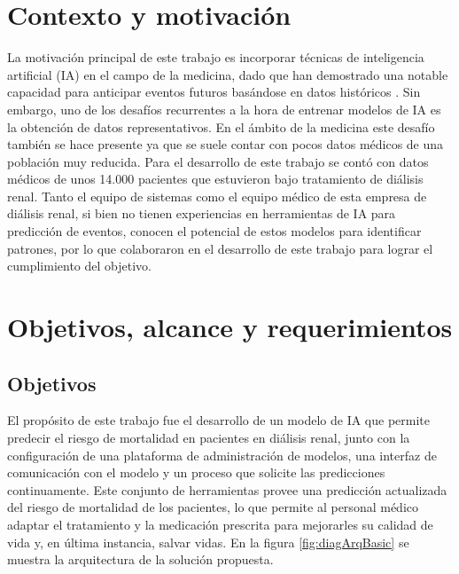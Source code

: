 \section{Contexto y motivación}

La motivación principal de este trabajo es incorporar técnicas de inteligencia artificial (IA) en el campo de la medicina, dado que han demostrado una notable capacidad para anticipar eventos futuros basándose en datos históricos \citep{ARTICULO2}. 
Sin embargo, uno de los desafíos recurrentes a la hora de entrenar modelos de IA es la obtención de datos representativos. En el ámbito de la medicina este desafío también se hace presente ya que se suele contar con pocos datos médicos de una población muy reducida.
Para el desarrollo de este trabajo se contó con datos médicos de unos 14.000 pacientes que estuvieron bajo tratamiento de diálisis renal. 
Tanto el equipo de sistemas como el equipo médico de esta empresa de diálisis renal, si bien no tienen experiencias en herramientas de IA para predicción de eventos, conocen el potencial de estos modelos para identificar patrones, por lo que colaboraron en el desarrollo de este trabajo para lograr el cumplimiento del objetivo.


\section{Objetivos, alcance y requerimientos}

\subsection{Objetivos}

El propósito de este trabajo fue el desarrollo de un modelo de IA que permite predecir el riesgo de mortalidad en pacientes en diálisis renal, junto con la configuración de una plataforma de administración de modelos, una interfaz de comunicación con el modelo y un proceso que solicite las predicciones continuamente. Este conjunto de herramientas provee una predicción actualizada del riesgo de mortalidad de los pacientes, lo que permite al personal médico adaptar el tratamiento y la medicación prescrita para mejorarles su calidad de vida y, en última instancia, salvar vidas. En la figura \ref{fig:diagArqBasic} se muestra la arquitectura de la solución propuesta. 

